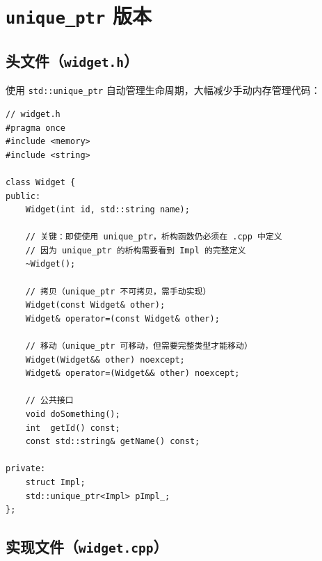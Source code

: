 \documentclass[12pt,a4paper,fontset=fandol]{ctexbook}
\begin{document}
\section{\texttt{unique\_ptr} 版本}

\subsection{头文件（\texttt{widget.h}）}

使用 \texttt{std::unique\_ptr} 自动管理生命周期，大幅减少手动内存管理代码：

\begin{lstlisting}[caption={PImpl unique\_ptr 版——头文件}]
// widget.h
#pragma once
#include <memory>
#include <string>

class Widget {
public:
    Widget(int id, std::string name);

    // 关键：即使使用 unique_ptr，析构函数仍必须在 .cpp 中定义
    // 因为 unique_ptr 的析构需要看到 Impl 的完整定义
    ~Widget();

    // 拷贝（unique_ptr 不可拷贝，需手动实现）
    Widget(const Widget& other);
    Widget& operator=(const Widget& other);

    // 移动（unique_ptr 可移动，但需要完整类型才能移动）
    Widget(Widget&& other) noexcept;
    Widget& operator=(Widget&& other) noexcept;

    // 公共接口
    void doSomething();
    int  getId() const;
    const std::string& getName() const;

private:
    struct Impl;
    std::unique_ptr<Impl> pImpl_;
};
\end{lstlisting}

\subsection{实现文件（\texttt{widget.cpp}）}
\end{document}
